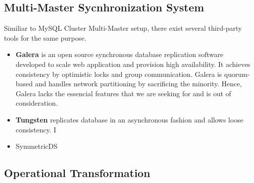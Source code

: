 \subsection{Multi-Master Sycnhronization System}
Similiar to MySQL Cluster Multi-Master setup, there exist several third-party tools for the same purpose.
\begin{itemize}
\item \textbf{Galera}\cite{galera} is an open source synchronous database replication software developed to scale web application and provision high availability. It achieves consistency by optimistic locks and group communication. Galera is quorum-based and handles network partitioning by sacrificing the minority. Hence, Galera lacks the essencial features that we are seeking for and is out of consideration.
\item \textbf{Tungsten}\cite{tungsten} replicates database in an asynchronous fashion and allows loose consistency. I
\item SymmetricDS
\end{itemize}


\subsection{Operational Transformation}
